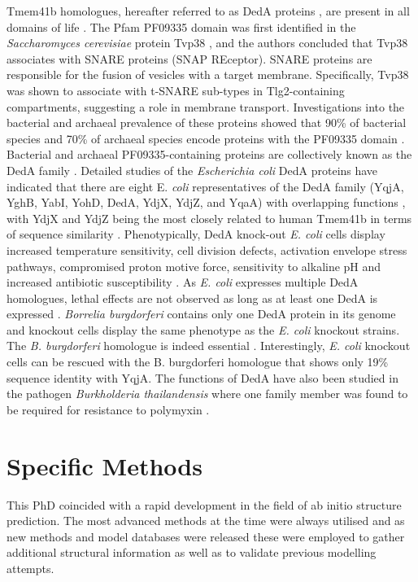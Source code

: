 Tmem41b homologues, hereafter referred to as DedA proteins \cite{Morita2019}, are present in all domains of life \cite{Keller2013}. The Pfam PF09335 domain was first identified in the \emph{Saccharomyces cerevisiae} protein Tvp38 \cite{Inadome2007}, and the authors concluded that Tvp38 associates with SNARE proteins (SNAP REceptor).  SNARE proteins are responsible for the fusion of vesicles with a target membrane.  Specifically, Tvp38 was shown to associate with t-SNARE sub-types in Tlg2-containing compartments, suggesting a role in membrane transport. Investigations into the bacterial and archaeal prevalence of these proteins showed that 90\% of bacterial species and 70\% of archaeal species encode proteins with the PF09335 domain \cite{Doerrler2013}. Bacterial and archaeal PF09335-containing proteins are collectively known as the DedA family \cite{Doerrler2013,nonet1987hist}. Detailed studies of the \emph{Escherichia coli} DedA proteins have indicated that there are eight E. \textit{coli} representatives of the DedA family (YqjA, YghB, YabI, YohD, DedA, YdjX, YdjZ, and YqaA) with overlapping functions \cite{Doerrler2013,Keller2013}, with YdjX and YdjZ being the most closely related to human Tmem41b in terms of sequence similarity \cite{Doerrler2013}. Phenotypically, DedA knock-out \emph{E. coli} cells display increased temperature sensitivity, cell division defects, activation envelope stress pathways, compromised proton motive force, sensitivity to alkaline pH and increased antibiotic susceptibility \cite{Doerrler2013}\cite{Keller2014}. As \emph{E. coli} expresses multiple DedA homologues, lethal effects are not observed as long as at least one DedA is expressed \cite{Keller2014}\cite{Thompkins2008}. \emph{Borrelia burgdorferi} contains only one DedA protein in its genome and knockout cells display the same phenotype as the \emph{E. coli} knockout strains.  The \emph{B. burgdorferi} homologue is indeed essential \cite{Feng2010}. Interestingly, \emph{E. coli} knockout cells can be rescued with the B. burgdorferi homologue that shows only 19\% sequence identity with YqjA. The functions of DedA have also been studied in the pathogen \emph{Burkholderia thailandensis} where one family member was found to be required for resistance to polymyxin \cite{Panta2019}.

\section{Specific Methods}
This PhD coincided with a rapid development in the field of ab initio structure prediction.  The most advanced methods at the time were always utilised and as new methods and model databases were released these were employed to gather additional structural information as well as to validate previous modelling attempts. 

